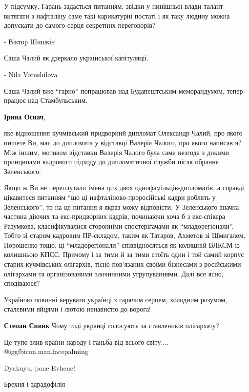 \begin{itemize}
\begin{itemize}
У підсумку, Гарань задається питанням, звідки у нинішньої влади талант витягати
з нафталіну саме такі карикатурні постаті і як таку людину можна допускати до
самого серця секретних переговорів?

- Віктор Шишкін

Саша Чалий як дзеркало української капітуляції.

- Nila Voroshilova

Саша Чалий вже \enquote{гарно} попрацював над Будапештським меморандумом, тепер
працює над Стамбульським.

\textbf{Ірина Оснач}, 

яке відношення кучмівський придворний дипломат Олександр Чалий, про якого
пишете Ви, має до дипломата у відставці Валерія Чалого, про якого написав я?
Між іншим, мотивом відставки Валерія Чалого була саме незгода з дикими
принципами кадрового підходу до дипломатичної служби після обрання Зеленського.

Якщо ж Ви не переплутали імена цих двох однофамільців-дипломатів, а справді
цікавитеся питанням \enquote{що ці нафталіново-проросійські кадри роблять у
Зеленського}, то на це питання я якраз можу відповісти. У Зеленського значна
частина діючих та екс-придворних кадрів, починаючи хоча б з екс-спікера
Разумкова, класифікувалися сторонніми спостерігачами як \enquote{младорегіонали}. Тобто
зі старим кадровим ПР-складом, таким як Татаров, Ахметов зі Шмигалем, Порошенко
тощо, ці \enquote{младорегіонали} співвідносяться як колишній ВЛКСМ із колишньою КПСС.
Причому і за тими й за тими стоїть один і той самий корпус старих кучмівських
олігархів, тісно пов'язаних своїми бізнесами з російськими олігархами та
організованими злочинними угрупуваннями. Далі все ясно, сподіваюся?

\end{itemize} %


Україною повинні керувати українці з гарячим серцем, холодним розумом,
сталевими яйцями і лютою ненавистю до ворога!

\textbf{Степан Сивик} Чому тоді укранці голосують за ставлеників олігархату?

Це тупо злив країни народу і ганьба від всього світу....  @igg{fbicon.man.facepalming} 

Dyakuyu, pane Evhene!

Брехня і здрадофілія


\end{itemize}
